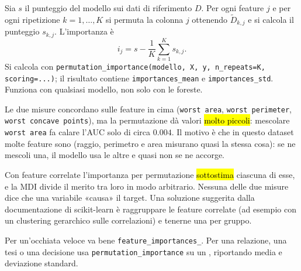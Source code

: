 \begin{tecnica}
Sia $s$ il punteggio del modello sui dati di riferimento $D$. Per ogni feature $j$ e per ogni ripetizione $k=1,\dots,K$ si permuta la colonna $j$ ottenendo $\tilde D_{k,j}$ e si calcola il punteggio $s_{k,j}$. L'importanza è
\[
i_j=s-\frac{1}{K}\sum_{k=1}^{K}s_{k,j}.
\]
Si calcola con \texttt{permutation\_importance(modello, X, y, n\_repeats=K, scoring=...)}; il risultato contiene \texttt{importances\_mean} e \texttt{importances\_std}. Funziona con qualsiasi modello, non solo con le foreste.
\end{tecnica}

\par\noindent\begin{minipage}{\linewidth}
\end{minipage}\par

\begin{esempio}
Le due misure concordano sulle feature in cima (\texttt{worst area}, \texttt{worst perimeter}, \texttt{worst concave points}), ma la permutazione dà valori \hl{molto piccoli}: mescolare \texttt{worst area} fa calare l'AUC solo di circa $0.004$. Il motivo è che in questo dataset molte feature sono  (raggio, perimetro e area misurano quasi la stessa cosa): se ne mescoli una, il modello usa le altre e quasi non se ne accorge.
\end{esempio}

\begin{attenzione}
Con feature correlate l'importanza per permutazione \hl{sottostima} ciascuna di esse, e la MDI divide il merito tra loro in modo arbitrario. Nessuna delle due misure dice che una variabile «causa» il target. Una soluzione suggerita dalla documentazione di scikit-learn è raggruppare le feature correlate (ad esempio con un clustering gerarchico sulle correlazioni) e tenerne una per gruppo.
\end{attenzione}

\begin{consiglio}
Per un'occhiata veloce va bene \texttt{feature\_importances\_}. Per una relazione, una tesi o una decisione usa \texttt{permutation\_importance} su un , riportando media e deviazione standard.
\end{consiglio}

